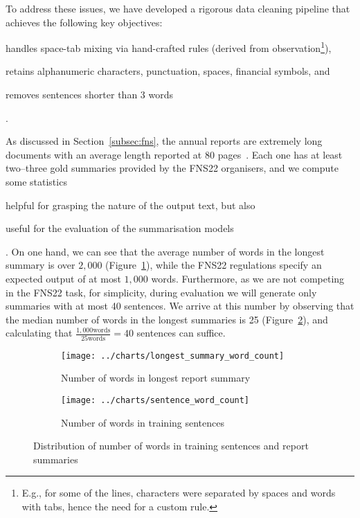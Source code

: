 To address these issues, we have developed a rigorous data cleaning pipeline that achieves the following key objectives:
\begin{enumerate*}
    \item handles space-tab mixing via hand-crafted rules (derived from observation\footnote{
      E.g., for some of the lines, characters were separated by spaces and words with tabs, hence the need for a custom rule.
    }),
    \item retains alphanumeric characters, punctuation, spaces, financial symbols, and
    \item removes sentences shorter than 3 words
\end{enumerate*}.

As discussed in Section~\ref{subsec:fns}, the annual reports are extremely long documents with an average length reported at 80 pages~\cite{litvak-vanetik-2021-summarization}.
Each one has at least two--three gold summaries provided by the FNS22 organisers, and we compute some statistics
\begin{enumerate*}
    \item helpful for grasping the nature of the output text, but also
    \item useful for the evaluation of the summarisation models
\end{enumerate*}.
On one hand, we can see that the average number of words in the longest summary is over $2,000$ (Figure~\ref{fig:longest_summary_word_count}), while the FNS22 regulations specify an expected output of at most $1,000$ words.
Furthermore, as we are not competing in the FNS22 task, for simplicity, during evaluation we will generate only summaries with at most 40 sentences.
We arrive at this number by observing that the median number of words in the longest summaries is 25 (Figure~\ref{fig:sentence_word_count}), and calculating that $\frac{1,000\text{words}}{25\text{words}}=40$ sentences can suffice.

\begin{figure}[ht]
    \begin{subfigure}{0.49\textwidth}
        \centering        \texttt{[image: ../charts/longest\_summary\_word\_count]}
        \caption{Number of words in longest report summary}
        \label{fig:longest_summary_word_count}
    \end{subfigure}%
    \hfill
    \begin{subfigure}{0.49\textwidth}
        \centering
        \texttt{[image: ../charts/sentence\_word\_count]}
        \caption{Number of words in training sentences}
        \label{fig:sentence_word_count}
    \end{subfigure}
    \caption{Distribution of number of words in training sentences and report summaries}
    \label{fig:word_count}
\end{figure}

